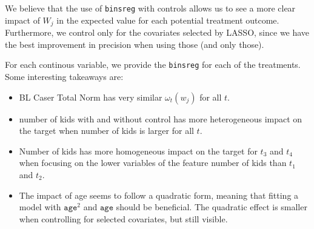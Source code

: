 \documentclass{article}
\begin{document}
We believe that the use of \texttt{binsreg} with controls allows us to see a more clear impact of $W_j$ in the expected value for each potential treatment outcome. Furthermore, we control only for the covariates selected by LASSO, since we have the best improvement in precision when using those (and only those).

For each continous variable, we provide the \texttt{binsreg} for each of the treatments. Some interesting takeaways are:

\begin{itemize}
  \item BL Caser Total Norm has very similar \( \omega_t(w_j) \) for all $t$.
  \item number of kids with and without control has more heterogeneous impact on the target when number of kids is larger for all $t$.
  \item Number of kids has more homogeneous impact on the target for $t_3$ and $t_4$ when focusing on the lower variables of the feature number of kids than $t_1$ and $t_2$.
  \item The impact of age seems to follow a quadratic form, meaning that fitting a model with $\texttt{age}^2$ and $\texttt{age}$ should be beneficial. The quadratic effect is smaller when controlling for selected covariates, but still visible.
\end{itemize}
\end{document}
